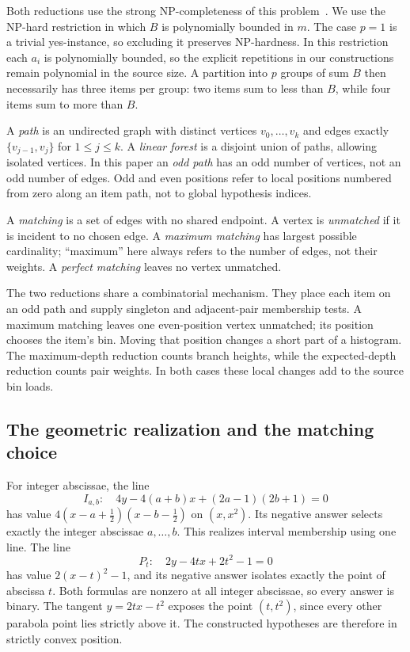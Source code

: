 Both reductions use the strong NP-completeness of this
problem~\cite{gj1979}.
We use the NP-hard restriction in which $B$ is polynomially bounded
in $m$. The case $p=1$ is a trivial yes-instance, so excluding it
preserves NP-hardness. In this restriction each $a_i$ is
polynomially bounded, so the explicit
repetitions in our constructions remain polynomial in the source
size. A partition into $p$ groups of sum $B$
then necessarily has three items per group: two items sum to less
than $B$, while four items sum to more than $B$.

\begin{definition}\label{def:paths-and-matchings}
A \emph{path} is an undirected graph with distinct vertices
$v_0,\ldots,v_k$ and edges exactly
$\{v_{j-1},v_j\}$ for $1\le j\le k$.
A \emph{linear forest} is a disjoint union of paths, allowing
isolated vertices. In this paper an \emph{odd path} has an odd
number of vertices, not an odd number of edges.
Odd and even positions refer to local positions numbered from zero
along an item path, not to global hypothesis indices.

A \emph{matching} is a set of edges with no shared endpoint.
A vertex is \emph{unmatched} if it is incident to no chosen edge.
A \emph{maximum matching} has largest possible cardinality;
``maximum'' here always refers to the number of edges, not their
weights. A \emph{perfect matching} leaves no vertex unmatched.
\end{definition}

The two reductions share a combinatorial mechanism. They place each
item on an odd path and supply singleton and adjacent-pair membership
tests. A maximum matching leaves one even-position vertex unmatched;
its position chooses the item's bin. Moving that position changes
a short part of a histogram. The maximum-depth reduction counts
branch heights, while the expected-depth reduction counts pair weights.
In both cases these local changes add to the source bin loads.

\subsection{The geometric realization and the matching choice}

For integer abscissae, the line
\[
 I_{a,b}:\quad
 4y-4(a+b)x+(2a-1)(2b+1)=0
\]
has value $4(x-a+\tfrac12)(x-b-\tfrac12)$ on $(x,x^2)$.
Its negative answer selects exactly the integer abscissae
$a,\ldots,b$. This realizes interval membership using one line.
The line
\begin{equation}\label{eq:private-singleton}
 P_t:\quad 2y-4tx+2t^2-1=0
\end{equation}
has value $2(x-t)^2-1$, and its negative answer isolates exactly
the point of abscissa $t$. Both formulas are nonzero at all integer
abscissae, so every answer is binary.
The tangent $y=2tx-t^2$ exposes the point $(t,t^2)$, since every
other parabola point lies strictly above it. The constructed
hypotheses are therefore in strictly convex position.

